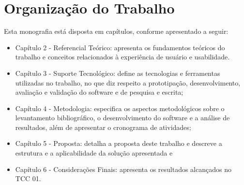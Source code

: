 \section{Organização do Trabalho}
\label{sec:OrganizacaodoTrabalho}

\begin{description}
    \item Esta monografia está disposta em capítulos, conforme apresentado a seguir:
          \begin{itemize}
              \item Capítulo 2 - Referencial Teórico: apresenta os fundamentos teóricos do trabalho e conceitos relacionados à experiência de usuário e usabilidade.

              \item Capítulo 3 - Suporte Tecnológico: define as tecnologias e ferramentas utilizadas no trabalho, no que diz respeito a prototipação, desenvolvimento,
                    avaliação e validação do software e de pesquisa e escrita;

              \item Capítulo 4 - Metodologia: especifica os aspectos metodológicos sobre o levantamento bibliográfico, o desenvolvimento do software e a análise de
              resultados, além de apresentar o cronograma de atividades;

              \item Capítulo 5 - Proposta: detalha a proposta deste trabalho e descreve a estrutura e a aplicabilidade da solução apresentada e

              \item Capítulo 6 - Considerações Finais: apresenta os resultados alcançados no TCC 01.
          \end{itemize}
\end{description}
